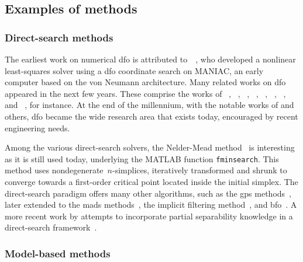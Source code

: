 \subsection{Examples of  methods}

\subsubsection{Direct-search methods}

The earliest work on numerical \gls{dfo} is attributed to~\citeauthor{Fermi_Metropolis_1952}~\cite{Fermi_Metropolis_1952}, who developed a nonlinear least-squares solver using a \gls{dfo} coordinate search on MANIAC, an early computer based on the von Neumann architecture.
Many related works on \gls{dfo} appeared in the next few years.
These comprise the works of \citeauthor{Rosenbrock_1960}~\cite{Rosenbrock_1960}, \citeauthor{Rastrigin_1963}~\cite{Rastrigin_1963}, \citeauthor{Powell_1964}~\cite{Powell_1964,Powell_1975a}, \citeauthor{Matyas_1965}~\cite{Matyas_1965}, \citeauthor{Nelder_Mead_1965}~\cite{Nelder_Mead_1965}, \citeauthor{Fletcher_1965}~\cite{Fletcher_1965}, \citeauthor{Box_1966}~\cite{Box_1966}, and \citeauthor{Karmanov_1974}~\cite{Karmanov_1974}, for instance.
At the end of the millennium, with the notable works of \citeauthor{Wright_1995} and others, \gls{dfo} became the wide research area that exists today, encouraged by recent engineering needs.

Among the various direct-search solvers, the Nelder-Mead method~\cite{Nelder_Mead_1965} is interesting as it is still used today, underlying the MATLAB function \texttt{fminsearch}.
This method uses nondegenerate~$n$-simplices, iteratively transformed and shrunk to converge towards a first-order critical point located inside the initial simplex.
The direct-search paradigm offers many other algorithms, such as the \gls{gps} methods~\cite{Booker_Etal_1999}, later extended to the \gls{mads} methods~\cite{Abramson_Audet_2006,Abramson_Etal_2009,Audet_Dennis_2006,Audet_Dennis_Digabel_2008,Digabel_2011}, the implicit filtering method~\cite{Kelley_2011}, and \gls{bfo}~\cite{Porcelli_Toint_2017}.
A more recent work by \citeauthor{Porcelli_Toint_2021} attempts to incorporate partial separability knowledge in a direct-search framework~\cite{Porcelli_Toint_2021}.

\subsubsection{Model-based methods}

